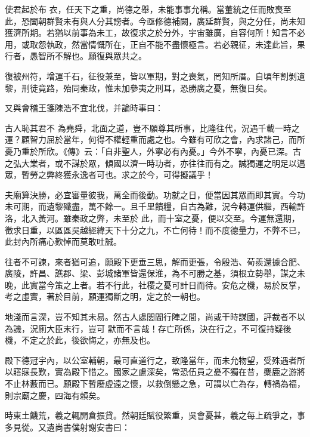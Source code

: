 \begin{pinyinscope}
 使君起於布
 衣，任天下之重，尚德之舉，未能事事允稱。當董統之任而敗喪至此，恐闔朝群賢未有與人分其謗者。今亟修德補闕，廣延群賢，與之分任，尚未知獲濟所期。若猶以前事為未工，故復求之於分外，宇宙雖廣，自容何所！知言不必用，或取怨執政，然當情慨所在，正自不能不盡懷極言。若必親征，未達此旨，果行者，愚智所不解也。願復與眾共之。



 復被州符，增運千石，征役兼至，皆以軍期，對之喪氣，罔知所厝。自頃年割剝遺黎，刑徒竟路，殆同秦政，惟未加參夷之刑耳，恐勝廣之憂，無復日矣。



 又與會稽王箋陳浩不宜北伐，并論時事曰：



 古人恥其君不
 為堯舜，北面之道，豈不願尊其所事，比隆往代，況遇千載一時之運？顧智力屈於當年，何得不權輕重而處之也。今雖有可欣之會，內求諸己，而所憂乃重於所欣。《傳》云：「自非聖人，外寧必有內憂。」今外不寧，內憂已深。古之弘大業者，或不謀於眾，傾國以濟一時功者，亦往往而有之。誠獨運之明足以邁眾，暫勞之弊終獲永逸者可也。求之於今，可得擬議乎！



 夫廟算決勝，必宜審量彼我，萬全而後動。功就之日，便當因其眾而即其實。今功未可期，而遺黎殲盡，萬不餘一。且千里饋糧，自古為難，況今轉運供繼，西輸許洛，北入黃河。雖秦政之弊，未至於
 此，而十室之憂，便以交至。今運無還期，徵求日重，以區區吳越經緯天下十分之九，不亡何待！而不度德量力，不弊不已，此封內所痛心歎悼而莫敢吐誠。



 往者不可諫，來者猶可追，願殿下更垂三思，解而更張，令殷浩、荀羨還據合肥、廣陵，許昌、譙郡、梁、彭城諸軍皆還保淮，為不可勝之基，須根立勢舉，謀之未晚，此實當今策之上者。若不行此，社稷之憂可計日而待。安危之機，易於反掌，考之虛實，著於目前，願運獨斷之明，定之於一朝也。



 地淺而言深，豈不知其未易。然古人處閭閻行陣之間，尚或干時謀國，評裁者不以為譏，況廁大臣末行，豈可
 默而不言哉！存亡所係，決在行之，不可復持疑後機，不定之於此，後欲悔之，亦無及也。



 殿下德冠宇內，以公室輔朝，最可直道行之，致隆當年，而未允物望，受殊遇者所以寤寐長歎，實為殿下惜之。國家之慮深矣，常恐伍員之憂不獨在昔，麋鹿之游將不止林藪而已。願殿下暫廢虛遠之懷，以救倒懸之急，可謂以亡為存，轉禍為福，則宗廟之慶，四海有賴矣。



 時東土饑荒，羲之輒開倉振貸。然朝廷賦役繁重，吳會憂甚，羲之每上疏爭之，事多見從。又遺尚書僕射謝安書曰：




\end{pinyinscope}
